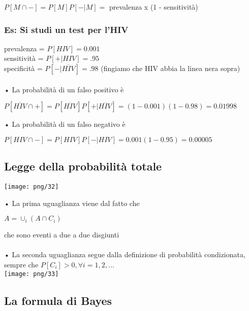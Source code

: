 \documentclass[12pt, letterpaper]{article}
\begin{document}
$P[M \cap -] = P[M]P[-|M] =$ prevalenza x (1 - sensitività)

\subsubsection{Es: Si studi un test per l'HIV}

prevalenza = $P[HIV] = 0.001$
\\
sensitività = $P[+|HIV] = .95$
\\
specificità = $P[-|\overline{HIV}] = .98$ (fingiamo che HIV abbia la linea nera sopra)\\
\\
• La probabilità di un falso positivo è 
\begin{center}$P[\overline{HIV} \cap +] = P[\overline{HIV}]P[+|\overline{HIV}] = (1 - 0.001)(1 - 0.98) = 0.01998$\end{center}
• La probabilità di un falso negativo è
\begin{center}$P[HIV \cap -] = P[HIV]P[-|HIV] = 0.001(1-0.95) = 0.00005$\end{center}

\subsection{Legge della probabilità totale}

\texttt{[image: png/32]}

• La prima uguaglianza viene dal fatto che 
\begin{center}$A = \cup_i(A\cap C_i)$\end{center}
che sono eventi a due a due disgiunti \\
\\
• La seconda uguaglianza segue dalla definizione di probabilità condizionata, 
sempre che $P[C_i] > 0, \forall i = 1,2,...$
\\
\texttt{[image: png/33]}

\subsection{La formula di Bayes}
\end{document}
